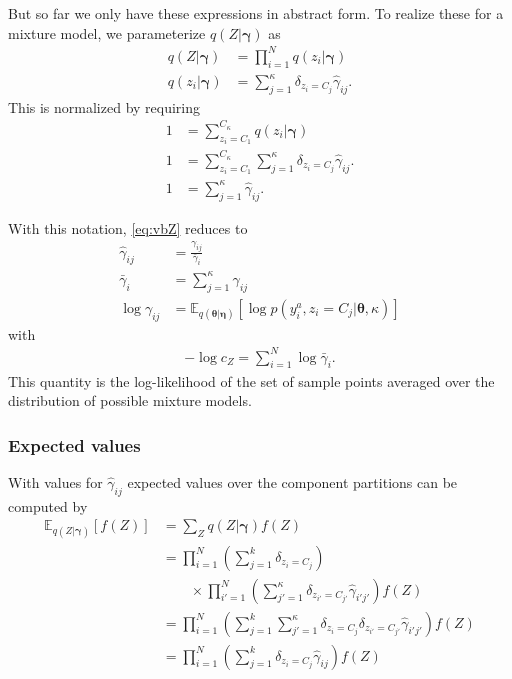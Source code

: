 \documentclass[aps,showpacs,twocolumn,prd,superscriptaddress,nofootinbib]{revtex4}
\newcommand{\nn}{\nonumber}
\newcommand{\E}[1]{{\mathbb E}_{#1}\!}
\begin{document}
But so far we only have these expressions in abstract form. To realize these for a mixture model, we parameterize $q(Z|\bm\gamma)$ as
\begin{align}
q(Z|\bm\gamma)&=\prod_{i=1}^Nq(z_i|\bm\gamma)\\
q(z_i|\bm\gamma)&=\sum_{j=1}^\kappa\delta_{z_i{=}C_j}\hat\gamma_{ij}.
\end{align}
This is normalized by requiring
\begin{align}
1&=\sum_{z_i=C_1}^{C_\kappa} q(z_i|\bm\gamma)\\
1&=\sum_{z_i=C_1}^{C_\kappa}\sum_{j=1}^\kappa\delta_{z_i{=}C_j}\hat\gamma_{ij}.\\
1&=\sum_{j=1}^\kappa\hat\gamma_{ij}.
\end{align}

With this notation, \eqref{eq:vbZ} reduces to
\begin{align}
\hat\gamma_{ij}&=\frac{\gamma_{ij}}{\bar\gamma_{i}}\label{eq:vbZmix}\\
\bar\gamma_{i}&=\sum_{j=1}^\kappa{\gamma_{ij}}\nn\\
\log\gamma_{ij}&=\E{q(\bm\theta|\bm\eta)}\left[\log p(y_i^a,z_i{=}C_j|\bm\theta,\kappa)\right]\nn
\end{align}
with
\begin{align}
  -\log c_Z = \sum_{i=1}^N\log\bar\gamma_i.\label{eq:logL}
\end{align}
This quantity is the log-likelihood of the set of sample points averaged over the distribution of possible mixture models.

\subsubsection{Expected values}

With values for $\hat\gamma_{ij}$ expected values over the component partitions can be computed by
\begin{align*}
\E{q(Z|\bm\gamma)}\left[f(Z)\right]&=\sum_{Z}q(Z|\bm\gamma)f(Z)\nn\\
&=\prod_{i=1}^N\left(\sum_{j=1}^k\delta_{z_i{=}C_j}\right)\nn\\
&\qquad\times\prod_{i'=1}^N\left(\sum_{j'=1}^\kappa\delta_{z_{i'}{=}C_{j'}}\hat\gamma_{i'j'}\right)f(Z)\nn\\
&=\prod_{i=1}^N\left(\sum_{j=1}^k\sum_{j'=1}^\kappa\delta_{z_i{=}C_j}\delta_{z_{i'}{=}C_{j'}}\hat\gamma_{i'j'}\right)f(Z)\nn\\
&=\prod_{i=1}^N\left(\sum_{j=1}^k\delta_{z_i{=}C_j}\hat\gamma_{ij}\right)f(Z)
\end{align*}
\end{document}
